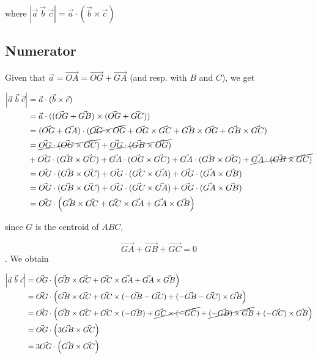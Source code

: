 \documentclass[10pt,a4paper]{article}
\begin{document}
where $ \left|{\vec {a}}\ {\vec {b}}\ {\vec {c}}\right|={\vec {a}}\cdot ({\vec {b}}\times {\vec {c}}) $


\subsection{Numerator}


Given that $\vec{a} = \vec{OA} = \vec{OG} + \vec{GA}$ (and resp.
with $B$ and $C$), we get


\begin{align*}
\left|{\vec {a}}\ {\vec {b}}\ {\vec {c}}\right|
	& =  {\vec {a}} \cdot ({\vec {b}}\times {\vec {c}}) \\
	& =  {\vec {a}} \cdot ({(\vec{OG} + \vec{GB})} \times {(\vec{OG} + \vec{GC})}) \\
	& =  {(\vec{OG} + \vec{GA})} \cdot (\cancel{\vec{OG} \times \vec{OG}}
	                      + \vec{OG} \times \vec{GC}
	                      + \vec{GB} \times \vec{OG}
	                      + \vec{GB} \times \vec{GC}) \\
	& = \cancel{\vec{OG} \cdot (\vec{OG} \times \vec{GC})}
	                      + \cancel{\vec{OG} \cdot (\vec{GB} \times \vec{OG})}\\
         & + \vec{OG} \cdot (\vec{GB} \times \vec{GC})
	  + \vec{GA} \cdot (\vec{OG} \times \vec{GC})
	  + \vec{GA} \cdot (\vec{GB} \times \vec{OG})
	  + \cancel{\vec{GA} \cdot (\vec{GB} \times \vec{GC})} \\
	& = \vec{OG} \cdot (\vec{GB} \times \vec{GC})
	+ \vec{OG} \cdot (\vec{GC} \times \vec{GA})
	+ \vec{OG} \cdot (\vec{GA} \times \vec{GB}) \\
	& = \vec{OG} \cdot (\vec{GB} \times \vec{GC})
	+ \vec{OG} \cdot (\vec{GC} \times \vec{GA})
	+ \vec{OG} \cdot (\vec{GA} \times \vec{GB})\\
	& = \vec{OG} \cdot \left(\vec{GB} \times \vec{GC}
	+\vec{GC} \times \vec{GA}
	+ \vec{GA} \times \vec{GB} \right)
\end{align*}

since $G$ is the centroid of $ABC$, 

\begin{equation}
\vec{GA} + \vec{GB} + \vec{GC}= 0
\label{eq1}
\end{equation}. We obtain

\begin{align}
\left|{\vec {a}}\ {\vec {b}}\ {\vec {c}}\right|
& = \vec{OG} \cdot \left(\vec{GB} \times \vec{GC}
	+\vec{GC} \times \vec{GA}
	+ \vec{GA} \times \vec{GB} \right) \nonumber \\
& = \vec{OG} \cdot \left(\vec{GB} \times \vec{GC}
	+\vec{GC} \times (-\vec{GB} - \vec{GC})
	+ (-\vec{GB} - \vec{GC}) \times \vec{GB} \right) \nonumber \\
& = \vec{OG} \cdot \left(\vec{GB} \times \vec{GC}
	+\vec{GC} \times (-\vec{GB}) + \cancel{\vec{GC} \times (- \vec{GC})}
	+ \cancel{(-\vec{GB}) \times \vec{GB}} + (- \vec{GC}) \times \vec{GB} \right) \nonumber \\
& = \vec{OG} \cdot \left(3 \vec{GB} \times \vec{GC} \right) \nonumber \\
& = 3 \vec{OG} \cdot \left( \vec{GB} \times \vec{GC} \right)
\end{align}
\end{document}
